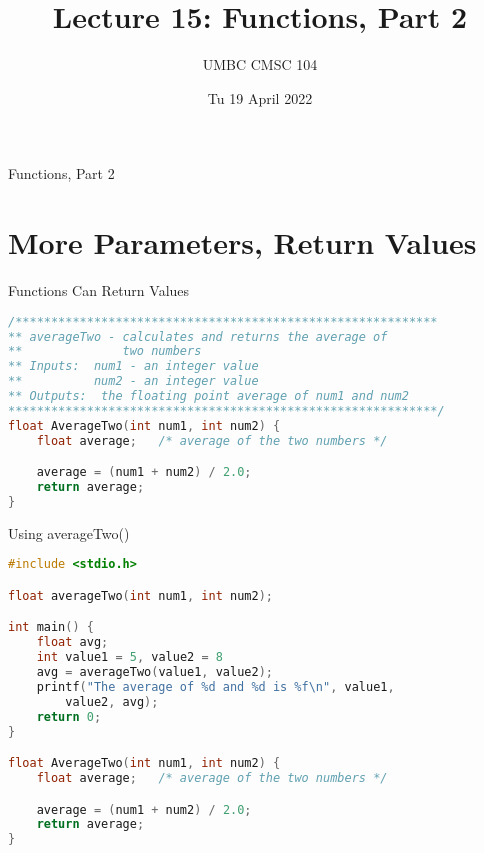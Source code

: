 \documentclass[graphics]{beamer}
\title{Lecture 15: Functions, Part 2}
\author{UMBC CMSC 104}
\date{Tu 19 April 2022}
\begin{document}
\begin{frame}{}
\centering
    Functions, Part 2
\end{frame}

\frame{\tableofcontents}

\section{More Parameters, Return Values}
\begin{frame}[fragile]{Functions Can Return Values}
    \begin{lstlisting}[language=C,basicstyle=\footnotesize,keywordstyle=\color{blue},commentstyle=\color{green},showstringspaces=false,stringstyle=\color{red}]
/***********************************************************
** averageTwo - calculates and returns the average of
**              two numbers
** Inputs:  num1 - an integer value
**          num2 - an integer value
** Outputs:  the floating point average of num1 and num2
************************************************************/
float AverageTwo(int num1, int num2) {
	float average;   /* average of the two numbers */

	average = (num1 + num2) / 2.0;
	return average;
}
    \end{lstlisting}
\end{frame}

\begin{frame}[fragile]{Using averageTwo()}
    \begin{lstlisting}[language=C,basicstyle=\footnotesize,keywordstyle=\color{blue},commentstyle=\color{green},showstringspaces=false,stringstyle=\color{red}]
#include <stdio.h>

float averageTwo(int num1, int num2);

int main() {
    float avg;
    int value1 = 5, value2 = 8
    avg = averageTwo(value1, value2);
    printf("The average of %d and %d is %f\n", value1,
        value2, avg);
    return 0;
}

float AverageTwo(int num1, int num2) {
	float average;   /* average of the two numbers */

	average = (num1 + num2) / 2.0;
	return average;
}
    \end{lstlisting}
\end{frame}
\end{document}
